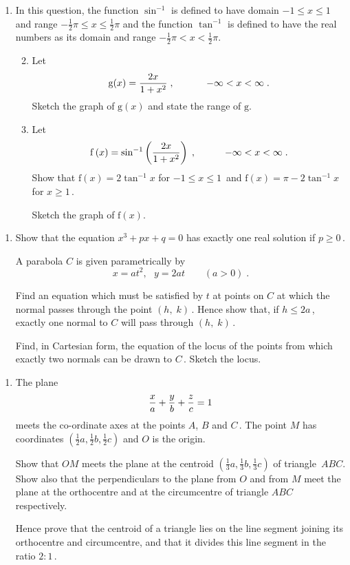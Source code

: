\documentclass[a4, 11pt]{report}
\newlength{\qspace}
\newcounter{qnumber}
\newenvironment{question}%
 {\vspace{\qspace}
  \begin{enumerate}[\bfseries 1\quad][10]%
    \setcounter{enumi}{\value{qnumber}}%
    \item%
 }
{
  \end{enumerate}
  \filbreak
  \stepcounter{qnumber}
 }
\newenvironment{questionparts}[1][1]%
 {
  \begin{enumerate}[\bfseries (i)]%
    \setcounter{enumii}{#1}
    \addtocounter{enumii}{-1}
    \setlength{\itemsep}{5mm}
    \setlength{\parskip}{8pt}
 }
 {
  \end{enumerate}
 }
\def\g{{\mathrm g}}
\def\f{{\mathrm f}}
\def\le{\leqslant}
\def\ge{\geqslant}
\def\l{\left(}
\def\r{\right)}
\begin{document}
\begin{question}
In this question, the  function $\sin^{-1}$ is defined to have domain $ -1\le x \le 1$ 
and range \linebreak $ - \frac{1}{2}\pi \le x \le \frac{1}{2}\pi$ and the function $\tan^{-1}$ is defined to have the real numbers as its
domain and range $ - \frac{1}{2}\pi <x < \frac{1}{2}\pi$.

\begin{questionparts}
\item
Let 
$$
\g(x) = \displaystyle {2x \over 1 + x^2}\;,  \ \ \ \ \ \ \ \ \ \ -\infty <x<\infty\;.
$$
Sketch the graph of $\g(x)$ and state the range of $\g$.
\item
Let 
\[
\displaystyle \f \l x \r = \sin^{-1} \l {2x \over 1 + x^2} \r \;,\ 
\ \ \ \ \ \ \ \ -\infty<x<\infty\;.
\] 
Show that
$
\f(x ) =  
2 \tan^{-1} x$   for $ -1 \le x \le 1\,$ and $\f(x) =
\pi - 2 \tan^{-1} x $ for $x\ge1\,$. 

Sketch the graph of $\f(x)$.
\end{questionparts}
\end{question}

\begin{question}
Show that the equation $x^3 + px + q=0$ has exactly one real
solution if  $p \ge 0\,$.

A parabola $C$ is given parametrically by
\[
x = at^2, \: \ \ y = 2at \: \: \: \ \ \  \ \ \  \l a > 0 \r \;.
\]

Find an equation which must be satisfied by $t$ at points on $C$ at
which the normal passes through the point $\l h , \; k \r\,$. Hence
show that, if $h \le 2a \,$, exactly one normal to $C$ will pass through
 $\l h , \; k \r \, $.


Find, in Cartesian form, the equation of the locus of the  points
from which exactly two normals can be drawn to $C\,$. Sketch the locus.
	\end{question}
	
\begin{question}
The plane
\[
{x \over a} + {y \over b} +{z \over c} = 1
\]
meets the co-ordinate axes at the points $A$, $B$ and $C\,$. The point $M$ has
 coordinates $\left( \frac12 a, \frac12 b, \frac 12 c \right)$
and $O$ is the origin.

Show that $OM$ meets the plane at the centroid  
$\left( \frac13 a, \frac13 b, \frac 13 c \right)$
of triangle~$ABC$.
Show also that the perpendiculars to the plane from $O$ and from $M$ meet the
plane at the orthocentre and at the circumcentre of triangle $ABC$ respectively.


Hence prove that the centroid of a triangle lies on the line segment
joining its orthocentre and circumcentre, and that it divides this
line segment in the ratio $2 : 1\,$.


\end{question}
	
\end{document}
